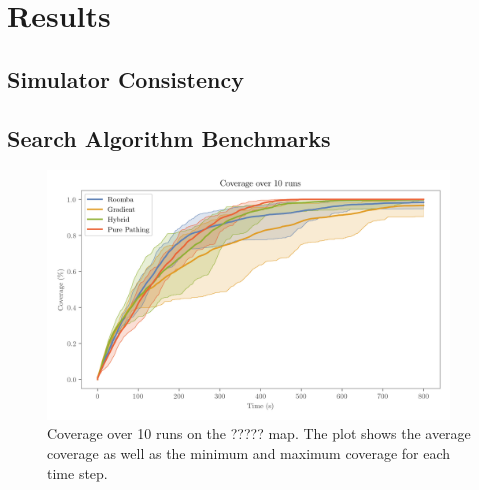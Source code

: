 \section{Results}
\label{sec:results}


\subsection{Simulator Consistency}

\subsection{Search Algorithm Benchmarks}

\begin{figure}[H]
    \begin{center}
        \includegraphics[width=0.95\textwidth]{./figures/plots/benchmarks/coverage-over-10-runs.png}
    \end{center}
    \caption{Coverage over 10 runs on the {\color{red}?????} map. The plot shows the average coverage as well as the minimum and maximum coverage for each time step.}
    \label{fig:coverage-benchmark}
\end{figure}
